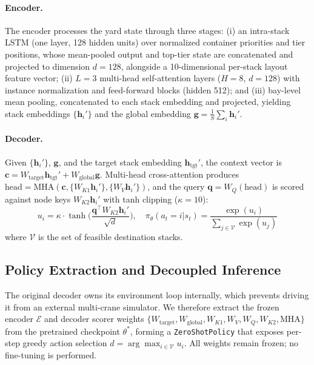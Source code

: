 \documentclass[11pt,a4paper]{elsarticle}
\begin{document}
\paragraph{Encoder.} The encoder processes the yard state through three stages: (i) an intra-stack LSTM (one layer, 128 hidden units) over normalized container priorities and tier positions, whose mean-pooled output and top-tier state are concatenated and projected to dimension $d=128$, alongside a 10-dimensional per-stack layout feature vector; (ii) $L=3$ multi-head self-attention layers ($H=8$, $d=128$) with instance normalization and feed-forward blocks (hidden 512); and (iii) bay-level mean pooling, concatenated to each stack embedding and projected, yielding stack embeddings $\{\mathbf{h}_i'\}$ and the global embedding $\mathbf{g} = \frac{1}{S}\sum_i \mathbf{h}_i'$.

\paragraph{Decoder.} Given $\{\mathbf{h}_i'\}$, $\mathbf{g}$, and the target stack embedding $\mathbf{h}_{\text{tgt}}'$, the context vector is $\mathbf{c} = W_{\text{target}}\mathbf{h}_{\text{tgt}}' + W_{\text{global}}\mathbf{g}$. Multi-head cross-attention produces $\text{head} = \text{MHA}(\mathbf{c}, \{W_{K1}\mathbf{h}_i'\}, \{W_V\mathbf{h}_i'\})$, and the query $\mathbf{q} = W_Q(\text{head})$ is scored against node keys $W_{K2}\mathbf{h}_i'$ with tanh clipping ($\kappa=10$):
\begin{equation}
    u_i = \kappa \cdot \tanh\!\Big( \frac{\mathbf{q}^\top W_{K2}\mathbf{h}_i'}{\sqrt{d}} \Big), \quad
    \pi_\theta(a_t = i | s_t) = \frac{\exp(u_i)}{\sum_{j \in \mathcal{V}} \exp(u_j)}
\end{equation}
where $\mathcal{V}$ is the set of feasible destination stacks.

\subsection{Policy Extraction and Decoupled Inference}
\label{sec:extraction}

The original decoder owns its environment loop internally, which prevents driving it from an external multi-crane simulator. We therefore extract the frozen encoder $\mathcal{E}$ and decoder scorer weights $\{W_{\text{target}},W_{\text{global}},W_{K1},W_V,W_Q,W_{K2},\text{MHA}\}$ from the pretrained checkpoint $\theta^\ast$, forming a \texttt{ZeroShotPolicy} that exposes per-step greedy action selection $d = \arg\max_{i\in\mathcal{V}} u_i$. All weights remain frozen; no fine-tuning is performed.
\end{document}
